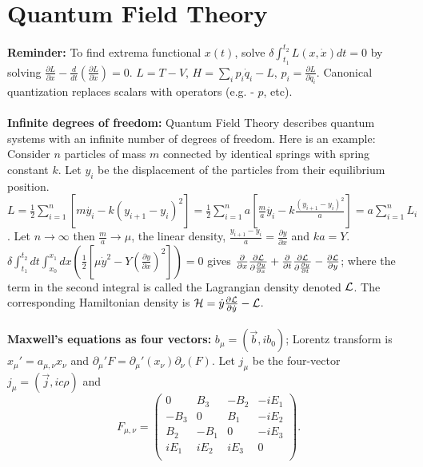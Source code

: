\section{Quantum Field Theory}
{\bf Reminder:} To find extrema functional $x(t)$, 
solve $\delta \int_{t_1}^{t_2} L(x, \dot{x}) dt= 0$ by solving
${\frac {\partial L} {\partial x}}- {\frac {d} {dt}} 
({\frac {\partial L} {\partial {\dot x}}})= 0$.
$L=T-V$, $H= \sum_i p_i {\dot q}_i -L$, $p_i= {\frac {\partial L}{\partial {\dot{q}_i}}}$.  
Canonical quantization replaces
scalars with operators (e.g. - $p$, etc).  
\\
\\
{\bf Infinite degrees of freedom:}
Quantum Field Theory describes quantum systems with an infinite number of degrees of freedom.  Here is an example:
Consider $n$ particles of mass $m$ connected by identical springs with spring 
constant $k$.  Let $y_i$ be the displacement of the
particles from their equilibrium position.
$L
= {\frac 1 2} \sum_{i=1}^n [m \dot{y_i}-k(y_{i+1}-y_i)^2]
= {\frac 1 2} \sum_{i=1}^n a [{\frac m a} \dot{y_i}-k {\frac {(y_{i+1}-y_i)^2} a}]
= a \sum_{i=1}^n L_i $.  Let 
$n \rightarrow \infty$ then ${\frac m a} \rightarrow \mu$, the linear density,
${\frac {y_{i+1}-y_i} a}= {\frac {\partial y} {\partial x}}$ and $ka= Y$.
$\delta \int_{t_1}^{t_2} dt \int_{x_0}^{x_1} dx ({\frac 1 2} 
[\mu {\dot{y}}^2 - Y ({\frac {\partial y}{\partial x}})^2])= 0$ gives
$
{\frac {\partial} {\partial x}} {\frac {\partial {\cal L}} {\partial {\frac {\partial y} {\partial x}}}} +
{\frac {\partial} {\partial t}} {\frac {\partial {\cal L}} {\partial {\frac {\partial y} {\partial t}}}} -
{\frac {\partial {\cal L}} {\partial y}}$; where the term in the second integral 
is called the Lagrangian density denoted ${\cal L}$.  The corresponding Hamiltonian density is
${\cal H}= \dot{y} {\frac {\partial {\cal L}} {\partial {\dot{y}}}}- {\cal L}
$.
\\
\\
{\bf Maxwell's equations as four vectors:}  
$b_{\mu}= ( {\vec b}, i b_0)$; Lorentz transform is $x_{\mu}'= a_{\mu, \nu} x_{\nu}$ and
$\partial_{\mu}' F = \partial_{\mu}' (x_{\nu}) \partial_{\nu} (F)$.
Let $j_{\mu}$ be the four-vector
$j_{\mu}= ({\vec j}, ic \rho)$ and
$$F_{\mu, \nu}=
\left(
\begin{array}{cccc}
0 & B_3 & -B_2 & -iE_1 \\
-B_3 & 0 & B_1 & -iE_2 \\
B_2 & -B_1 & 0 & -iE_3 \\
iE_1 & iE_2 & iE_3 & 0 \\
\end{array}
\right).$$  
